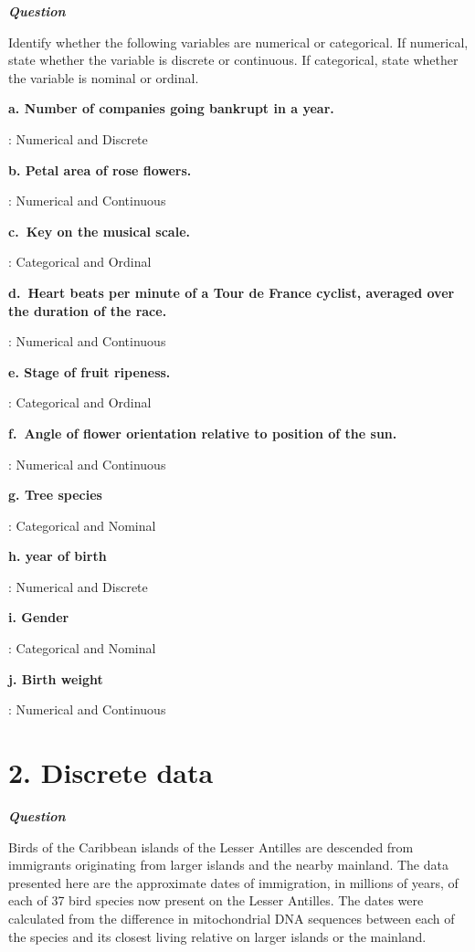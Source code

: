 \documentclass[
  letterpaper,
  DIV=11,
  numbers=noendperiod]{scrreprt}
\begin{document}

\textbf{\emph{Question}}

Identify whether the following variables are numerical or categorical.
If numerical, state whether the variable is discrete or continuous. If
categorical, state whether the variable is nominal or ordinal.

\textbf{a. Number of companies going bankrupt in a year.}

: Numerical and Discrete

\textbf{b. Petal area of rose flowers.}

: Numerical and Continuous

\textbf{c.~Key on the musical scale.}

: Categorical and Ordinal

\textbf{d.~Heart beats per minute of a Tour de France cyclist, averaged
over the duration of the race.}

: Numerical and Continuous

\textbf{e. Stage of fruit ripeness.}

: Categorical and Ordinal

\textbf{f.~Angle of flower orientation relative to position of the sun.}

: Numerical and Continuous

\textbf{g. Tree species}

: Categorical and Nominal

\textbf{h. year of birth}

: Numerical and Discrete

\textbf{i. Gender}

: Categorical and Nominal

\textbf{j. Birth weight}

: Numerical and Continuous

\section*{2. Discrete data}\label{discrete-data}


\textbf{\emph{Question}}

Birds of the Caribbean islands of the Lesser Antilles are descended from
immigrants originating from larger islands and the nearby mainland. The
data presented here are the approximate dates of immigration, in
millions of years, of each of 37 bird species now present on the Lesser
Antilles. The dates were calculated from the difference in mitochondrial
DNA sequences between each of the species and its closest living
relative on larger islands or the mainland.
\end{document}
